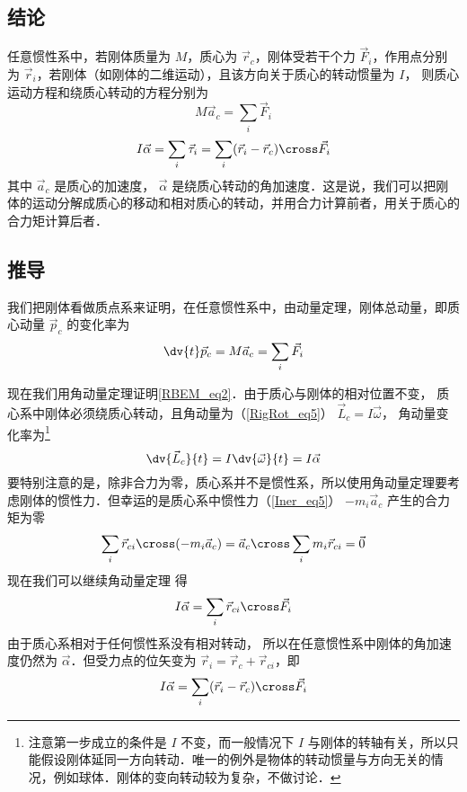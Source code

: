 

\subsection{结论}
任意惯性系中，若刚体质量为 $M$，质心为 $\vec r_c$，刚体受若干个力 $\vec F_i$，作用点分别为 $\vec r_i$，若刚体（如刚体的二维运动），且该方向关于质心的转动惯量为 $I$， 则质心运动方程和绕质心转动的方程分别为
\begin{equation}\label{RBEM_eq1}
M\vec a_c = \sum_i \vec F_i
\end{equation}
\begin{equation}\label{RBEM_eq2}
I \vec \alpha = \sum_i \vec \tau_i = \sum_i (\vec r_i-\vec r_c) \cross  \vec F_i
\end{equation}
其中 $\vec a_c$ 是质心的加速度， $\vec \alpha$ 是绕质心转动的角加速度．这是说，我们可以把刚体的运动分解成质心的移动和相对质心的转动，并用合力计算前者，用关于质心的合力矩计算后者．

\subsection{推导}
我们把刚体看做质点系来证明，在任意惯性系中，由动量定理，刚体总动量，即质心动量 $\vec p_c$ 的变化率为
\begin{equation}
\dv{t} \vec p_c = M \vec a_c = \sum_i \vec F_i
\end{equation}

现在我们用角动量定理证明\autoref{RBEM_eq2}．由于质心与刚体的相对位置不变，%
质心系中刚体必须绕质心转动，且角动量为（\autoref{RigRot_eq5}） $\vec L_c = I \vec\omega$， 角动量变化率为\footnote{注意第一步成立的条件是 $I$ 不变，而一般情况下 $I$ 与刚体的转轴有关，所以只能假设刚体延同一方向转动．唯一的例外是物体的转动惯量与方向无关的情况，例如球体．刚体的变向转动较为复杂，不做讨论．}
\begin{equation}
\dv{\vec L_c}{t} = I \dv{\vec \omega}{t} = I \vec\alpha
\end{equation}
要特别注意的是，除非合力为零，质心系并不是惯性系，所以使用角动量定理要考虑刚体的惯性力．但幸运的是质心系中惯性力（\autoref{Iner_eq5}） $-m_i \vec a_c$ 产生的合力矩为零
\begin{equation}
\sum_i \vec r_{ci}\cross (-m_i \vec a_{c}) = \vec a_{c} \cross \sum_i m_i \vec r_{ci} = \vec 0
\end{equation}
现在我们可以继续角动量定理 得
\begin{equation}
I \vec\alpha = \sum_i \vec r_{ci} \cross  \vec F_i
\end{equation}
由于质心系相对于任何惯性系没有相对转动， 所以在任意惯性系中刚体的角加速度仍然为 $\vec\alpha$．但受力点的位矢变为 $\vec r_i = \vec r_c + \vec r_{ci}$，即
\begin{equation}\label{RBEM_eq7}
I \vec \alpha = \sum_i (\vec r_i-\vec r_c) \cross  \vec F_i
\end{equation}

